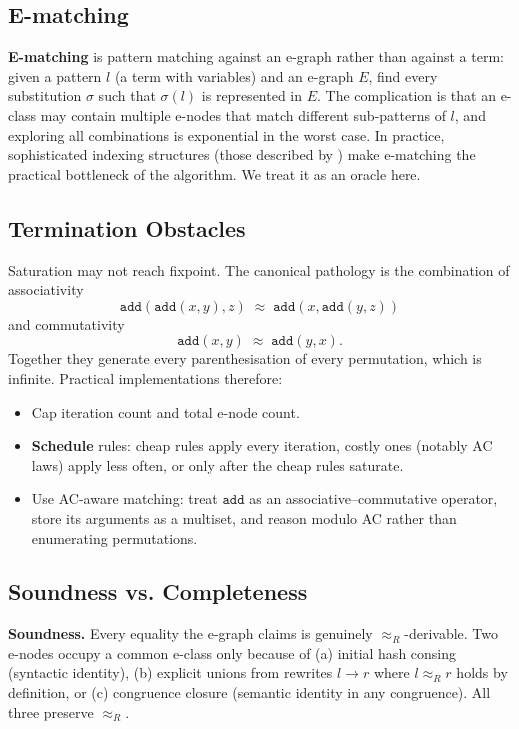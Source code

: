 \documentclass[11pt,a4paper]{article}
\begin{document}
\subsection{E-matching}\label{sec:e-matching}

\textbf{E-matching} is pattern matching against an e-graph rather than against a term: given a pattern $l$ (a term with variables) and an e-graph $E$, find every substitution $\sigma$ such that $\sigma(l)$ is represented in $E$. The complication is that an e-class may contain multiple e-nodes that match different sub-patterns of $l$, and exploring all combinations is exponential in the worst case. In practice, sophisticated indexing structures (those described by \citet{willsey2021egg}) make e-matching the practical bottleneck of the algorithm. We treat it as an oracle here.

\subsection{Termination Obstacles}\label{sec:sat-termination}

Saturation may not reach fixpoint. The canonical pathology is the combination of associativity
\[
  \mathtt{add}(\mathtt{add}(x, y), z) \;\approx\; \mathtt{add}(x, \mathtt{add}(y, z))
\]
and commutativity
\[
  \mathtt{add}(x, y) \;\approx\; \mathtt{add}(y, x).
\]
Together they generate every parenthesisation of every permutation, which is infinite. Practical implementations therefore:
\begin{itemize}
\item Cap iteration count and total e-node count.
\item \textbf{Schedule} rules: cheap rules apply every iteration, costly ones (notably AC laws) apply less often, or only after the cheap rules saturate.
\item Use AC-aware matching: treat $\mathtt{add}$ as an associative--commutative operator, store its arguments as a multiset, and reason modulo AC rather than enumerating permutations.
\end{itemize}

\subsection{Soundness vs. Completeness}\label{sec:sat-soundness}

\textbf{Soundness.} Every equality the e-graph claims is genuinely $\approx_R$-derivable. Two e-nodes occupy a common e-class only because of (a) initial hash consing (syntactic identity), (b) explicit unions from rewrites $l \to r$ where $l \approx_R r$ holds by definition, or (c) congruence closure (semantic identity in any congruence). All three preserve $\approx_R$.
\end{document}
